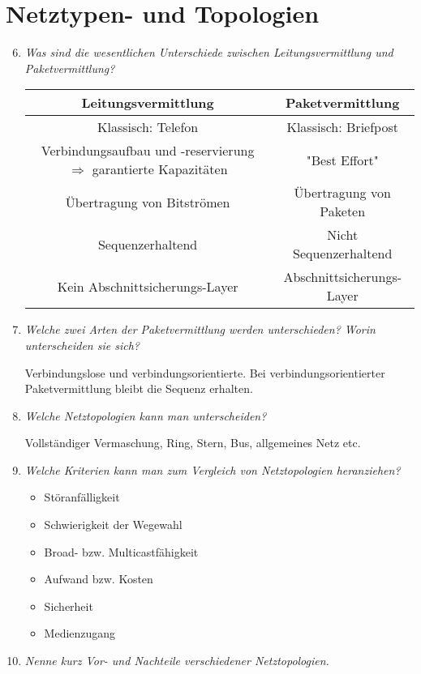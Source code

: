 \documentclass[hidelinks]{article}
\begin{document}
\section{Netztypen- und Topologien}
\begin{enumerate}
\setcounter{enumi}{5}
\item \textit{Was sind die wesentlichen Unterschiede zwischen Leitungsvermittlung und Paketvermittlung?}

\begin{tabular}{c|c}
Leitungsvermittlung&Paketvermittlung\\
\hline
Klassisch: Telefon&Klassisch: Briefpost\\
Verbindungsaufbau und -reservierung $\Rightarrow$ garantierte Kapazitäten&"Best Effort"\\
Übertragung von Bitströmen&Übertragung von Paketen\\
Sequenzerhaltend&Nicht Sequenzerhaltend\\
Kein Abschnittsicherungs-Layer&Abschnittsicherungs-Layer\\
\end{tabular}

\item \textit{Welche zwei Arten der Paketvermittlung werden unterschieden? Worin unterscheiden sie sich?}

Verbindungslose und verbindungsorientierte. Bei verbindungsorientierter Paketvermittlung bleibt die Sequenz erhalten.

\item \textit{Welche Netztopologien kann man unterscheiden?}

Vollständiger Vermaschung, Ring, Stern, Bus, allgemeines Netz etc.

\item \textit{Welche Kriterien kann man zum Vergleich von Netztopologien heranziehen?}

\begin{itemize}
\item Störanfälligkeit
\item Schwierigkeit der Wegewahl
\item Broad- bzw. Multicastfähigkeit
\item Aufwand bzw. Kosten
\item Sicherheit
\item Medienzugang
\end{itemize}

\item \textit{Nenne kurz Vor- und Nachteile verschiedener Netztopologien.}


\end{enumerate}
\end{document}
